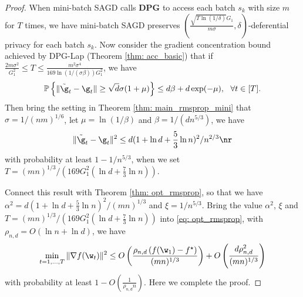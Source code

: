 \begin{proof} When mini-batch SAGD calls \textbf{DPG} to access each batch $s_k$ with size $m$ for $T$ times, we have mini-batch SAGD preserves $(\frac{\sqrt{T \ln(1/\delta)} G_1}{m\sigma}, \delta)$-deferential privacy for each batch $s_k$. Now consider the gradient concentration bound achieved by DPG-Lap (Theorem \ref{thm: acc_basic}) that if $ \frac{2m\sigma^2}{G_1^2}\leq T \leq \frac{m^2 \sigma^4}{169 \ln(1/(\sigma \beta))G_1^2}$, we have 
\begin{align*}
\mathbb{P}\left\{\|\tilde \g_t - \g_t\| \geq \sqrt{d}\sigma(1+\mu)\right\} \leq d\beta + d\exp(-\mu), \ \ \forall t \in [T]. 
\end{align*}
Then bring the setting in Theorem \ref{thm: main_rmsprop_mini} that $\sigma = 1/(nm)^{1/6}$, let $\mu = \ln (1/\beta)$ and $\beta = 1/(d n^{5/3})$, we have
\begin{equation}
 \|\tilde \g_t - \g_t\|^2 \leq d(1+\ln d + \frac{5}{3}\ln n)^2/n^{2/3}   \nr
\end{equation}
with probability at least $1- 1/n^{5/3}$, when we set\\ $T = (mn)^{1/3}/\left(169G_1^2(\ln d + \frac{7}{3}\ln n)\right)$. 


Connect this result with Theorem \ref{thm: opt_rmsprop}, so that we have $\alpha^2 = d(1+\ln d + \frac{5}{3}\ln n)^2/(mn)^{1/3}$ and $\xi = 1/n^{5/3}$. Bring the value $\alpha^2$, $\xi$ and $T = (mn)^{1/3}/\left(169G_1^2(\ln d + \frac{7}{3}\ln n)\right)$ into \eqref{eq: opt_rmsprop}, with $\rho_{n,d} = O \left(\ln n + \ln d \right)$, we have
\begin{align*}
\min_{t = 1,..., T}\|\nabla f(\w_t)\|^2 \leq O\left( \frac{\rho_{n,d} \left(f(\w_1) - f^\star \right)}{(mn)^{1/3}} \right) + O \left( \frac{d \rho_{n,d}^2}{(mn)^{1/3}}\right)
\end{align*} 
with probability at least $1-O\left(\frac{1}{\rho_{n,d} n}\right)$. Here we complete the proof.

\end{proof}

